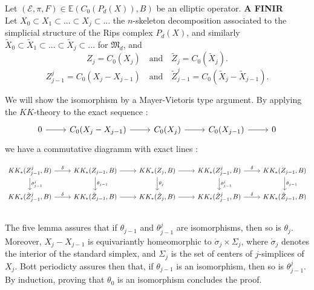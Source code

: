 Let $(\mathcal E, \pi, F)\in \mathbb E(C_0(P_d(X)),B)$ be an elliptic operator. \textbf{A FINIR}\\


Let $X_0\subset X_1\subset ...\subset X_j \subset ...$ the $n$-skeleton decomposition associated to the simplicial structure of the Rips complex $P_d(X)$, and similarly $\tilde X_0\subset \tilde X_1\subset ...\subset \tilde X_j \subset ...$ for $\mathfrak M_d$, and 
\[Z_j = C_0(X_j)\quad \text{and}\quad\tilde Z_j = C_0(\tilde X_j).\]
\[Z^j_{j-1} = C_0(X_j-X_{j-1})\quad \text{and}\quad\tilde Z^j_{j-1} = C_0(\tilde X_j-\tilde X_{j-1}).\]

We will show the isomorphism by a Mayer-Vietoris type argument. By applying the $KK$-theory to the exact sequence :
\[\begin{tikzcd}0 \arrow{r}& C_0(X_j - X_{j-1})\arrow{r} & C_0(X_j)\arrow{r} & C_0(X_{j-1})\arrow{r} & 0\end{tikzcd}\]
we have a commutative diagramm with exact lines :

\[\begin{tikzcd}
KK_*(Z^j_{j-1},B)\arrow{r}{\delta}\arrow{d}{\theta^j_{j-1}} & KK_*(Z_{j-1},B)\arrow{r}\arrow{d}{\theta_{j-1}} & KK_*(Z_j,B)\arrow{r}\arrow{d}{\theta_j} & KK_*(Z^j_{j-1},B)\arrow{r}{\delta} \arrow{d}{\theta^j_{j-1}} & KK_*(Z_{j-1},B)\arrow{d}{\theta_{j-1}}\\
KK_*(\tilde Z^j_{j-1},B)\arrow{r}{\delta} & KK_*(\tilde Z_{j-1},B)\arrow{r} & KK_*(\tilde Z_j,B)\arrow{r} & KK_*(\tilde Z^j_{j-1},B)\arrow{r}{\delta} & KK_*(\tilde Z_{j-1},B)\\
\end{tikzcd}\]
The five lemma assures that if $\theta_{j-1}$ and $\theta^j_{j-1}$ are isomorphisms, then so is $\theta_j$. Moreover, $X_j-X_{j-1}$ is equivariantly homeomorphic to $\mathring \sigma_j \times \Sigma_j$, where  $\mathring \sigma _ j $ denotes the interior of the standard simplex, and   $\Sigma_j$ is the set of centers of $j$-simplices of $X_j$. Bott periodicty assures then that, if $\theta_{j-1}$ is an isomorphism, then so is $\theta^j_{j-1}$. By induction, proving that $\theta_0$ is an isomorphism concludes the proof.